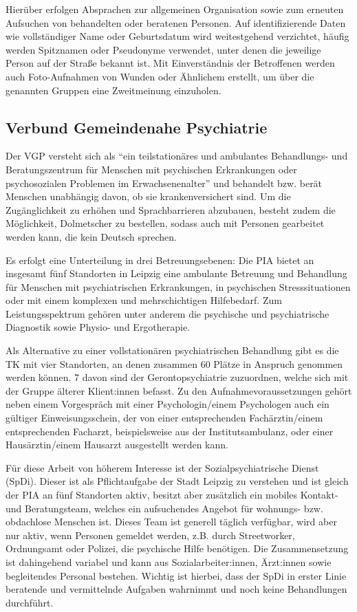 Hierüber erfolgen Absprachen zur allgemeinen Organisation sowie zum erneuten Aufsuchen von behandelten oder beratenen Personen. Auf identifizierende Daten wie vollständiger Name oder Geburtsdatum wird weitestgehend verzichtet, häufig werden Spitznamen oder Pseudonyme verwendet, unter denen die jeweilige Person auf der Straße bekannt ist. Mit Einverständnis der Betroffenen werden auch Foto-Aufnahmen von Wunden oder Ähnlichem erstellt, um über die genannten Gruppen eine Zweitmeinung einzuholen.

\subsection{Verbund Gemeindenahe Psychiatrie}

Der \ac{VGP} versteht sich als \enquote{ein teilstationäres und ambulantes Behandlungs- und Beratungszentrum für Menschen mit psychischen Erkrankungen oder	psychosozialen Problemen im Erwachsenenalter} \citep{VGP.2023} und behandelt bzw. berät Menschen unabhängig davon, ob sie krankenversichert sind. Um die Zugänglichkeit zu erhöhen und Sprachbarrieren abzubauen, besteht zudem die Möglichkeit, Dolmetscher zu bestellen, sodass auch mit Personen gearbeitet werden kann, die kein Deutsch sprechen.

Es erfolgt eine Unterteilung in drei Betreuungsebenen: Die \ac{PIA} bietet an insgesamt fünf Standorten in Leipzig eine ambulante Betreuung und Behandlung für Menschen mit psychiatrischen Erkrankungen, in psychischen Stresssituationen oder mit einem komplexen und mehrschichtigen Hilfebedarf. Zum Leistungsspektrum gehören unter anderem die psychische und psychiatrische Diagnostik sowie Physio- und Ergotherapie.

Als Alternative zu einer vollstationären psychiatrischen Behandlung gibt es die \ac{TK} mit vier Standorten, an denen zusammen 60 Plätze in Anspruch genommen werden können. 7 davon sind der Gerontopsychiatrie zuzuordnen, welche sich mit der Gruppe älterer Klient:innen befasst. Zu den Aufnahmevoraussetzungen gehört neben einem Vorgespräch mit einer Psychologin/einem Psychologen auch ein gültiger Einweisungsschein, der von einer entsprechenden Fachärztin/einem entsprechenden Facharzt, beispielsweise aus der Institutsambulanz, oder einer Hausärztin/einem Hausarzt ausgestellt werden kann.

Für diese Arbeit von höherem Interesse ist der Sozialpsychiatrische Dienst (\acs{SpDi}). Dieser ist als Pflichtaufgabe der Stadt Leipzig zu verstehen und ist gleich der \ac{PIA} an fünf Standorten aktiv, besitzt aber zusätzlich ein mobiles Kontakt- und Beratungsteam, welches ein aufsuchendes Angebot für wohnungs- bzw. obdachlose Menschen ist. Dieses Team ist generell täglich verfügbar, wird aber nur aktiv, wenn Personen gemeldet werden, z.B. durch Streetworker, Ordnungsamt oder Polizei, die psychische Hilfe benötigen. Die Zusammensetzung ist dahingehend variabel und kann aus Sozialarbeiter:innen, Ärzt:innen sowie begleitendes Personal bestehen. Wichtig ist hierbei, dass der \ac{SpDi} in erster Linie beratende und vermittelnde Aufgaben wahrnimmt und noch keine Behandlungen durchführt.

